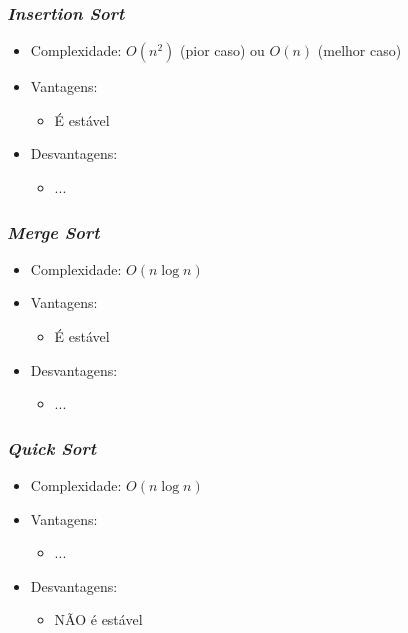 \documentclass[aspectratio=169]{beamer}
\begin{document}
\begin{frame}\frametitle{\emph{Insertion Sort}}
\begin{itemize}
	\item Complexidade: $O(n^2)$ (pior caso) ou $O(n)$ (melhor caso)
	\item Vantagens:
	\begin{itemize}	
		\item É estável
	\end{itemize}
	\item Desvantagens:
	\begin{itemize}	
		\item ...
	\end{itemize}
\end{itemize}
\end{frame}

\begin{frame}\frametitle{\emph{Merge Sort}}
\begin{itemize}
	\item Complexidade: $O(n\log{n})$
	\item Vantagens:
	\begin{itemize}	
		\item É estável
	\end{itemize}
	\item Desvantagens:
	\begin{itemize}	
		\item ...
	\end{itemize}
\end{itemize}
\end{frame}

\begin{frame}\frametitle{\emph{Quick Sort}}
\begin{itemize}
	\item Complexidade: $O(n\log{n})$
	\item Vantagens:
	\begin{itemize}
		\item ...
	\end{itemize}
	\item Desvantagens:
	\begin{itemize}	
		\item NÃO é estável
	\end{itemize}
\end{itemize}
\end{frame}
\end{document}
